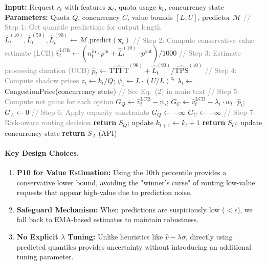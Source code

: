\begin{algorithm}[H]
\caption{Learning-Augmented Primal-Dual Routing (LA-PD)}
\label{alg:app_lapd}
\begin{algorithmic}[1]
\STATE \textbf{Input:} Request $r_t$ with features $\mathbf{x}_t$, quota usage $k_t$, concurrency state
\STATE \textbf{Parameters:} Quota $Q$, concurrency $C$, value bounds $[L, U]$, predictor $\mathcal{M}$
\STATE \textcolor{gray}{// Step 1: Get quantile predictions for output length}
\STATE $\hat{L}_t^{(10)}, \hat{L}_t^{(50)}, \hat{L}_t^{(90)} \gets \mathcal{M}.\text{predict}(\mathbf{x}_t)$
\STATE \textcolor{gray}{// Step 2: Compute conservative value estimate (LCB)}
\STATE $\hat{v}_t^{\text{LCB}} \gets (n_t^{\text{in}} \cdot p^{\text{in}} + \hat{L}_t^{(10)} \cdot p^{\text{out}}) / 1000$
\STATE \textcolor{gray}{// Step 3: Estimate processing duration (UCB)}
\STATE $\hat{p}_t \gets \widehat{\text{TTFT}}^{(90)} + \hat{L}_t^{(90)} / \widehat{\text{TPS}}^{(10)}$
\STATE \textcolor{gray}{// Step 4: Compute shadow prices}
\STATE $z_t \gets k_t / Q$; \quad $\psi_t \gets L \cdot (U/L)^{z_t}$
\STATE $\lambda_t \gets$ CongestionPrice(concurrency state) \textcolor{gray}{// See Eq.~(2) in main text}
\STATE \textcolor{gray}{// Step 5: Compute net gains for each option}
\STATE $G_Q \gets \hat{v}_t^{\text{LCB}} - \psi_t$; \quad $G_C \gets \hat{v}_t^{\text{LCB}} - \lambda_t \cdot w_t \cdot \hat{p}_t$; \quad $G_A \gets 0$
\STATE \textcolor{gray}{// Step 6: Apply capacity constraints}
    \STATE $G_Q \gets -\infty$
\ENDIF
{}
    \STATE $G_C \gets -\infty$
\ENDIF
\STATE \textcolor{gray}{// Step 7: Risk-aware routing decision}
    \STATE \textbf{return} $S_Q$; update $k_{t+1} \gets k_t + 1$
    \STATE \textbf{return} $S_C$; update concurrency state
\ELSE
    \STATE \textbf{return} $S_A$ (API)
\ENDIF
\end{algorithmic}
\end{algorithm}

\paragraph{Key Design Choices.}
\begin{enumerate}
    \item \textbf{P10 for Value Estimation:} Using the 10th percentile provides a conservative lower bound, avoiding the "winner's curse" of routing low-value requests that appear high-value due to prediction noise.
    \item \textbf{Safeguard Mechanism:} When predictions are suspiciously low ($< \epsilon$), we fall back to EMA-based estimates to maintain robustness.
    \item \textbf{No Explicit $\lambda$ Tuning:} Unlike heuristics like $\hat{v} - \lambda\sigma$, directly using predicted quantiles provides uncertainty without introducing an additional tuning parameter.
\end{enumerate}

